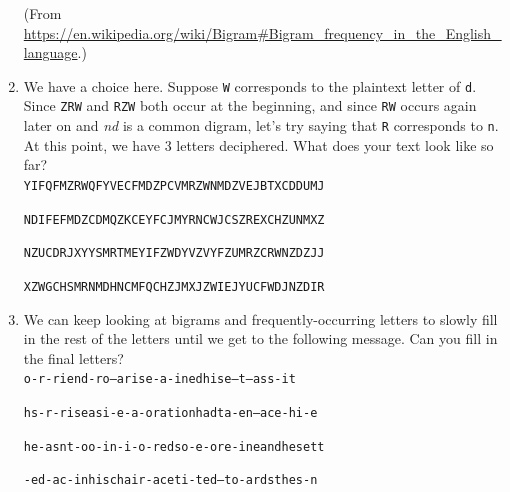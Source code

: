 \documentclass[12pt]{amsart}
\theoremstyle{plain}
\theoremstyle{definition}
\theoremstyle{remark}
\begin{document}
\begin{enumerate}[1.]
\begin{center}
	\tiny{(From \url{https://en.wikipedia.org/wiki/Bigram#Bigram_frequency_in_the_English_language}.)}
	\end{center}
	\vspace{.4in}
	\item We have a choice here.  Suppose \texttt{W} corresponds to the plaintext letter of \texttt{d}.  Since \texttt{ZRW} and \texttt{RZW} both occur at the beginning, and since \texttt{RW} occurs again later on and \textit{nd} is a common digram, let's try saying that \texttt{R} corresponds to \texttt{n}.  At this point, we have 3 letters deciphered.  What does your text look like so far?\\

{\Large\texttt{YIFQFMZRWQFYVECFMDZPCVMRZWNMDZVEJBTXCDDUMJ}}\\\vspace{.1in}

{\Large\texttt{NDIFEFMDZCDMQZKCEYFCJMYRNCWJCSZREXCHZUNMXZ}}\\\vspace{.1in}

{\Large\texttt{NZUCDRJXYYSMRTMEYIFZWDYVZVYFZUMRZCRWNZDZJJ}}\\\vspace{.1in}

{\Large\texttt{XZWGCHSMRNMDHNCMFQCHZJMXJZWIEJYUCFWDJNZDIR}}\\\vspace{.1in}

\item We can keep looking at bigrams and frequently-occurring letters to slowly fill in the rest of the letters until we get to the following message.  Can you fill in the final letters?\\


{\Large\texttt{o-r-riend-ro--arise-a-inedhise--t---ass-it}}\\\vspace{.1in}

{\Large\texttt{hs-r-riseasi-e-a-orationhadta-en--ace-hi-e}}\\\vspace{.1in}

{\Large\texttt{he-asnt-oo-in-i-o-redso-e-ore-ineandhesett}}\\\vspace{.1in}

{\Large\texttt{-ed-ac-inhischair-aceti-ted--to-ardsthes-n}}\\\vspace{.1in}


\end{enumerate}
\end{document}
